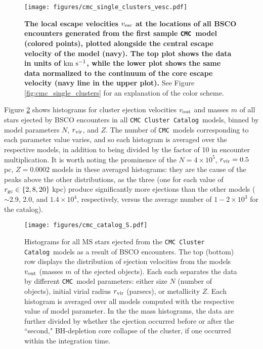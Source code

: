 \documentclass[twocolumn]{aastex631}
\newcommand{\CMC}{\texttt{CMC}}
\newcommand{\CMCcat}{\texttt{CMC Cluster Catalog}}
\begin{document}
\begin{figure}
    \centering
    \texttt{[image: figures/cmc\_single\_clusters\_vesc.pdf]}
    \caption{
        \textbf{
        The local escape velocities $v_{\rm esc}$ at the locations of all BSCO encounters generated from the first sample \CMC\ model (colored points), plotted alongside the central escape velocity of the model (navy).
        The top plot shows the data in units of ${\rm km~s^{-1}}$, while the lower plot shows the same data normalized to the continuum of the core escape velocity (navy line in the upper plot).
        }
        See Figure \ref{fig:cmc_single_clusters} for an explanation of the color scheme.
    }
    \label{fig:cmc_single_clusters_vesc}
\end{figure}

Figure \ref{fig:cmc_catalog} shows histograms for cluster ejection velocities $v_{\rm out}$ and masses $m$ of all stars ejected by BSCO encounters in all \CMCcat\ models, binned by model parameters $N$, $r_{\rm vir}$, and $Z$.
The number of \CMC\ models corresponding to each parameter value varies, and so each histogram is averaged over the respective models, in addition to being divided by the factor of 10 in encounter multiplication.
It is worth noting the prominence of the $N = 4\times10^5$, $r_{\rm vir} = 0.5$ pc, $Z = 0.0002$ models in these averaged histograms: they are the cause of the peaks above the other distributions, as the three (one for each value of $r_{\rm gc} \in \{2, 8, 20\}$ kpc) produce significantly more ejections than the other models ($\sim$2.9, 2.0, and $1.4 \times 10^4$, respectively, versus the average number of $1-2 \times 10^3$ for the catalog).

\begin{figure*}
    \centering
    \texttt{[image: figures/cmc\_catalog\_S.pdf]}
    \caption{
        Histograms for all MS stars ejected from the \CMCcat\ models as a result of BSCO encounters.
        The top (bottom) row displays the distribution of ejection velocities from the models $v_{\rm out}$ (masses $m$ of the ejected objects).
        Each each separates the data by different \CMC\ model parameters: either size $N$ (number of objects), initial virial radius $r_{\rm vir}$ (parsecs), or metallicity $Z$.
        Each histogram is averaged over all models computed with the respective value of model parameter.
        In the the mass histograms, the data are further divided by whether the ejection occurred before or after the ``second," BH-depletion core collapse of the cluster, if one occurred within the integration time.
    }
    \label{fig:cmc_catalog}
\end{figure*}
\end{document}
